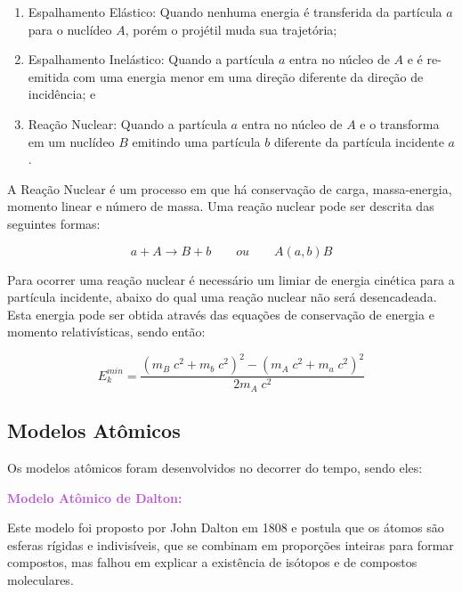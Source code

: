 \documentclass[11pt,a4paper]{article}
\begin{document}
	\begin{enumerate}
		\item Espalhamento Elástico: Quando nenhuma energia é transferida da partícula $a$ para o nuclídeo $A$, porém o projétil muda sua trajetória;
		\item Espalhamento Inelástico: Quando a partícula $a$ entra no núcleo de $A$ e é re-emitida com uma energia menor em uma direção diferente da direção de incidência; e   
		\item Reação Nuclear: Quando a partícula $a$ entra no núcleo de $A$ e o transforma em um nuclídeo $B$ emitindo uma partícula $b$ diferente da partícula incidente $a$. 
	\end{enumerate}            

	A Reação Nuclear é um  processo em que há conservação de carga, massa-energia, momento linear e número de massa. Uma reação nuclear pode ser descrita das seguintes formas:
                    
    \begin{equation}
		a + A \rightarrow B + b \qquad ou \qquad A(a, b)B
	\end{equation}                
                
    Para ocorrer uma reação nuclear é necessário um limiar de energia cinética para a partícula incidente, abaixo do qual uma reação nuclear não será desencadeada. Esta energia pode ser obtida através das equações de conservação de energia e momento relativísticas, sendo então:

    \begin{equation}
		E_k^{min} = \frac{\left(m_B \; c^2 + m_b \; c^2\right)^2 - \left(m_A \; c^2 + m_a \; c^2\right)^2}{2m_A \; c^2}
	\end{equation}                

\subsection*{Modelos Atômicos}

    Os modelos atômicos foram desenvolvidos no decorrer do tempo, sendo eles:
            
	\textcolor{MediumOrchid}{\large\LobsterTwo\textbf{Modelo Atômico de Dalton:}}

        Este modelo foi proposto por John Dalton em 1808 e postula que os átomos são esferas rígidas e indivisíveis, que se combinam em proporções inteiras para formar compostos, mas falhou em explicar a existência de isótopos e de compostos moleculares.
\end{document}
